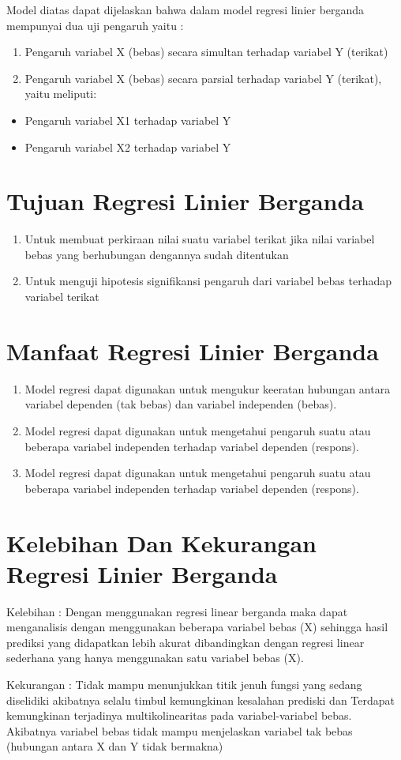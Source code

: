 \par Model diatas dapat dijelaskan bahwa dalam model regresi linier berganda mempunyai dua uji pengaruh yaitu :  
\begin{enumerate}
\item 	Pengaruh variabel X (bebas) secara simultan terhadap variabel Y (terikat)  
\item 	Pengaruh variabel X (bebas) secara parsial terhadap variabel Y (terikat), yaitu meliputi:  
\end{enumerate}
    \begin{itemize}
               \item Pengaruh variabel X1 terhadap variabel Y  
               \item Pengaruh variabel X2 terhadap variabel Y 
               \end{itemize}
\section{Tujuan Regresi Linier Berganda}
\begin{enumerate}
\item Untuk membuat perkiraan nilai suatu variabel terikat jika nilai variabel bebas yang berhubungan dengannya sudah ditentukan
\item Untuk menguji hipotesis signifikansi pengaruh dari variabel bebas terhadap variabel terikat
\end{enumerate}

\section{Manfaat Regresi Linier Berganda}
\begin{enumerate}
\item Model regresi dapat digunakan untuk mengukur keeratan hubungan antara variabel dependen (tak bebas) dan variabel independen (bebas). 
\item Model regresi dapat digunakan untuk mengetahui pengaruh suatu atau beberapa variabel independen terhadap variabel dependen (respons).
\item Model regresi dapat digunakan untuk mengetahui pengaruh suatu atau beberapa variabel independen terhadap variabel dependen (respons).
\end{enumerate}

\section{Kelebihan Dan Kekurangan Regresi Linier Berganda}
\par Kelebihan : Dengan menggunakan regresi linear berganda maka dapat menganalisis dengan menggunakan beberapa variabel bebas (X) sehingga hasil prediksi yang didapatkan lebih akurat dibandingkan dengan regresi linear sederhana yang hanya menggunakan satu variabel bebas (X). 
\par Kekurangan : Tidak mampu menunjukkan titik jenuh fungsi yang sedang diselidiki akibatnya selalu timbul kemungkinan kesalahan prediski dan Terdapat kemungkinan terjadinya multikolinearitas pada variabel-variabel bebas. Akibatnya variabel bebas tidak mampu menjelaskan variabel tak bebas (hubungan antara X dan Y tidak bermakna)

